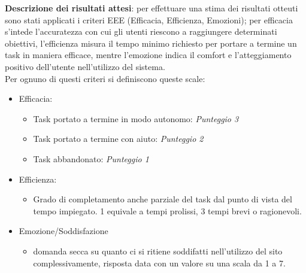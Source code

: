 \documentclass[12pt,a4paper]{report}
\begin{document}
  \textbf{Descrizione dei risultati attesi}: per effettuare una stima dei risultati otteuti sono stati applicati i criteri EEE (Efficacia, Efficienza, Emozioni); per efficacia s'intede l'accuratezza con cui gli utenti riescono a raggiungere determinati obiettivi, l'efficienza misura il tempo minimo richiesto per portare a termine un task in maniera efficace, mentre l'emozione indica il comfort e l'atteggiamento positivo dell'utente nell'utilizzo del sistema.\\
  Per ognuno di questi criteri si definiscono queste scale:
  \begin{itemize}
  \item Efficacia:
    \begin{itemize}
    \item Task portato a termine in modo autonomo: \textit{Punteggio 3}
    \item Task portato a termine con aiuto: \textit{Punteggio 2}
    \item Task abbandonato: \textit{Punteggio 1}
    \end{itemize}
  \item Efficienza:
    \begin{itemize}
    \item Grado di completamento anche parziale del task dal punto di vista del tempo impiegato. 1 equivale a tempi prolissi, 3 tempi brevi o ragionevoli.
    \end{itemize}
  \item Emozione/Soddisfazione
    \begin{itemize}
    \item domanda secca su quanto ci si ritiene soddifatti nell'utilizzo del sito complessivamente, risposta data con un valore su una scala da 1 a 7.
    \end{itemize}
  \end{itemize}
\end{document}
